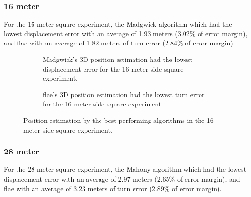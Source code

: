 \newpage

\subsubsection{16 meter}

For the 16-meter square experiment, the Madgwick algorithm which had the lowest displacement error with an average of 1.93 meters (3.02\% of error margin), and \acrshort{flae} with an average of 1.82 meters of turn error (2.84\% of error margin).

\vspace{-0.5cm}

\vspace{-1.5cm}

\begin{figure}[H]
    \centering
    \begin{subfigure}{0.49\textwidth}
        \centering
        \resizebox{1\linewidth}{!}{}
        \caption{Madgwick's 3D position estimation had the lowest displacement error for the 16-meter side square experiment.}
        \label{fig:square162D}
    \end{subfigure}
    \begin{subfigure}{0.49\textwidth}
        \centering
        \resizebox{1\linewidth}{!}{}
        \caption{\acrshort{flae}'s 3D position estimation had the lowest turn error for the 16-meter  side square experiment.}
        \label{fig:square163D}
    \end{subfigure}
    \caption{Position estimation by the best performing algorithms in the 16-meter side square experiment.}
    \label{fig:square16}
\end{figure}

\subsubsection{28 meter}

For the 28-meter square experiment, the Mahony algorithm which had the lowest displacement error with an average of 2.97 meters (2.65\% of error margin), and \acrshort{flae} with an average of 3.23 meters of turn error (2.89\% of error margin).

\vspace{-0.5cm}

\vspace{-1.5cm}

